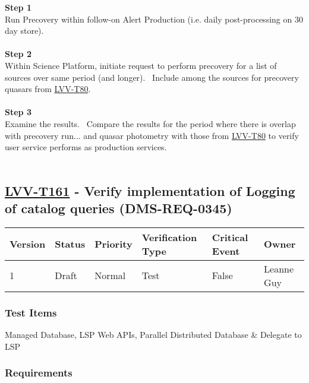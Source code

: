 \textbf{Step 1}\\
Run Precovery within follow-on Alert Production (i.e. daily
post-processing on 30 day store).\\
~\\
\textbf{Step 2}\\
Within Science Platform, initiate request to perform precovery for a
list of sources over same period (and longer). ~Include among the
sources for precovery quasars from
\href{https://jira.lsstcorp.org/secure/Tests.jspa\#/testCase/LVV-T80}{LVV-T80}.~\\
~\\
\textbf{Step 3}\\
Examine the results. ~Compare the results for the period where there is
overlap with precovery run... and quasar photometry with those from
\href{https://jira.lsstcorp.org/secure/Tests.jspa\#/testCase/LVV-T80}{LVV-T80}
to verify user service performs as production services.\\
~\\

\hypertarget{lvv-t161---verify-implementation-of-logging-of-catalog-queries-dms-req-0345}{%
\subsection{\texorpdfstring{\href{https://jira.lsstcorp.org/secure/Tests.jspa\#/testCase/LVV-T161}{LVV-T161}
- Verify implementation of Logging of catalog queries
(DMS-REQ-0345)}{LVV-T161 - Verify implementation of Logging of catalog queries (DMS-REQ-0345)}}\label{lvv-t161---verify-implementation-of-logging-of-catalog-queries-dms-req-0345}}

\begin{longtable}[]{@{}llllll@{}}
\toprule
Version & Status & Priority & Verification Type & Critical Event &
Owner\tabularnewline
\midrule
\endhead
1 & Draft & Normal & Test & False & Leanne Guy\tabularnewline
\bottomrule
\end{longtable}

\hypertarget{test-items-137}{%
\subsubsection{Test Items}\label{test-items-137}}

Managed Database, LSP Web APIs, Parallel Distributed Database \&
Delegate to LSP

\hypertarget{requirements-138}{%
\subsubsection{Requirements}\label{requirements-138}}


